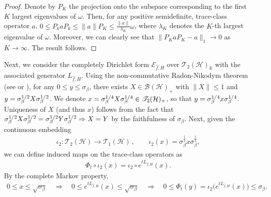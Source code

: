 \documentclass[11pt]{amsart}
\newcommand{\1}{\mathbbm{1}}
\theoremstyle{plain}
\theoremstyle{definition}
\theoremstyle{remark}
\numberwithin{equation}{section}
\begin{document}
\begin{proof}
 
 Denote by $P_K$ the projection onto the subspace corresponding to the first $K$ largest eigenvalues of $\omega$. Then, for any positive semidefinite, trace-class operator $a$, $0\le P_ka P_k\le \|a\|P_K\le \frac{\|a\|}{\lambda_K}\omega$, where $\lambda_K$ denotes the $K$-th largest eigenvalue of $\omega$. Moreover, we can clearly see that $\|P_Ka P_K-a\|_1\to 0$ as $K\to\infty$. The result follows.
\end{proof}



\noindent  Next, we consider the completely Dirichlet form $\mathcal{E}_{\widehat{f},H}$ over $\mathscr{T}_2(\mathcal{H})_{\mathbb{R}}$ with the associated generator $L_{\widehat{f},H}$.
Using the non-commutative Radon-Nikodym theorem (see \cite[Lemma 2.2c]{schmitt1986radon} or \cite[Lemma 1.5]{Goldstein1995}), for any $0\le y\le \sigma_\beta$, there exists $X\in \mathscr{B}(\mathcal{H})_+$ with $\|X\|\le 1$ and $y=\sigma_\beta^{\smash{\scriptstyle 1/2}}X\sigma_\beta^{\smash{\scriptstyle 1/2}}$. We denote $x=\sigma_\beta^{\smash{\scriptstyle 1/4}}X\sigma_\beta^{\smash{\scriptstyle 1/4}}\in\mathscr{T}_2(\mathcal{H})_+$, so that $y=\sigma_{\beta}^{\smash{1/4}}x\sigma_\beta^{\smash{1/4}}$. Uniqueness of $X$ (and thus $x$) follows from the fact that $\sigma_\beta^{\smash{1/2}}X\sigma_\beta^{\smash{1/2}}=\sigma_\beta^{\smash{1/2}}Y\sigma_\beta^{\smash{1/2}}\Rightarrow X=Y$ by the faithfulness of $\sigma_\beta$. Next, given the continuous embedding 
\begin{align*}
\iota_2:\mathscr{T}_2(\mathcal{H})\to\mathscr{T}_1(\mathcal{H})\,,\qquad \iota_2(x)=\sigma_\beta^{\frac{1}{4}}x\sigma_\beta^{\frac{1}{4}},
\end{align*}
we can define induced maps on the trace-class operators as
\begin{align}\label{eqcLtoL}
\Phi_t\circ \iota_2(x)=\iota_2\circ e^{tL_{\widehat{f},H}}(x).
\end{align}
By the complete Markov property, 
\begin{align*}
0\le x\le \sqrt{ \sigma_\beta}\quad \Rightarrow\quad  0\le e^{tL_{\widehat{f},H}}(x)\le \sqrt{ \sigma_\beta}\quad \Rightarrow \quad 0\le  \Phi_t(y)=  \iota_2\Big( e^{tL_{\widehat{f},H}}(x) \Big)\le \sigma_\beta.
\end{align*}
\end{document}
